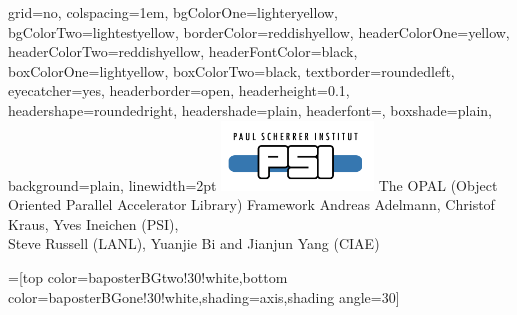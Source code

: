 \documentclass[portrait,final]{baposter}
\begin{document}
\newlength{\leftimgwidth}
\begin{poster}%
  {
  grid=no,
  colspacing=1em,
  bgColorOne=lighteryellow,
  bgColorTwo=lightestyellow,
  borderColor=reddishyellow,
  headerColorOne=yellow,
  headerColorTwo=reddishyellow,
  headerFontColor=black,
  boxColorOne=lightyellow,
  boxColorTwo=black,
  textborder=roundedleft,
  eyecatcher=yes,
  headerborder=open,
  headerheight=0.1\textheight,
  headershape=roundedright,
  headershade=plain,
  headerfont=\large\textsf, %
  boxshade=plain,
  background=plain,
  linewidth=2pt
  }
  {\includegraphics[height=5em]{logopsi}} %
  {\sf %
   The OPAL (Object Oriented Parallel Accelerator Library) Framework 
}
  {\sf %
  \vspace{1em}Andreas Adelmann, Christof Kraus, Yves Ineichen (PSI), \\ Steve Russell (LANL), Yuanjie Bi and Jianjun Yang (CIAE)\\
 
 
  }
  {%
    \makebox[8em][r]{%
      \begin{minipage}{12em}
        \hfill
      \end{minipage}
    }
  }

  =[top color=baposterBGtwo!30!white,bottom color=baposterBGone!30!white,shading=axis,shading angle=30]

     \setlength{\leftimgwidth}{0.78em+8.0em}

    \newcommand{\colouredcircle}[1]{%
      \tikz{\useasboundingbox (-0.2em,-0.32em) rectangle(0.2em,0.32em); \draw[draw=black,fill=baposterBGone!80!black!#1!white,line width=0.03em] (0,0) circle(0.18em);}}


\end{poster}
\end{document}
